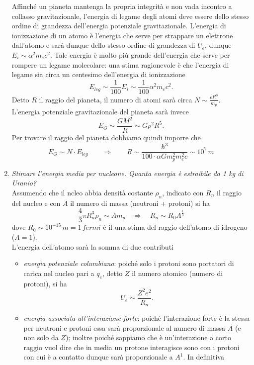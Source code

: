 \begin{enumerate}
	Affinché un pianeta mantenga la propria integrità e non vada incontro a collasso gravitazionale, l'energia di legame degli atomi deve essere dello stesso ordine di grandezza dell'energia potenziale gravitazionale. L'energia di ionizzazione di un atomo è l'energia che serve per strappare un elettrone dall'atomo e sarà dunque dello stesso ordine di grandezza di $ U_e $, dunque $ E_{i} \sim \alpha^2 m_e c^2 $. Tale energia è molto più grande dell'energia che serve per rompere un legame molecolare: una stima ragionevole è che l'energia di legame sia circa un centesimo dell'energia di ionizzazione \[E_{leg} \sim \frac{1}{100} E_{i} \sim \frac{1}{100} \alpha^2 m_e c^2.\] Detto $ R $ il raggio del pianeta, il numero di atomi sarà circa $ N \sim \frac{\rho R^3}{m_p} $. L'energia potenziale gravitazionale del pianeta sarà invece \[E_G \sim \frac{G M^2}{R} \sim G \rho^2 R^5.\] Per trovare il raggio del pianeta dobbiamo quindi imporre che 
	\begin{equation}
	E_G \sim N \cdot E_{leg} \qquad \Rightarrow \qquad R \sim \frac{\hbar^3}{100 \cdot \alpha G m_p^2 m_e^2 c} \sim 10^7 \, \si{m}
	\end{equation}
	\item \emph{Stimare l'energia media per nucleone. Quanta energia è estraibile da 1 \si{kg} di Uranio?} \\
	Assumendo che il ncleo abbia densità costante $ \rho_n $, indicato con $ R_n $ il raggio del nucleo e con $ A $ il numero di massa (neutroni + protoni) si ha 
	\begin{equation}
	\frac{4}{3} \pi R_n^3 \rho_n \sim A m_p \quad \Rightarrow \quad R_n \sim R_0 A^\frac{1}{3}
	\end{equation}
	dove $ R_0 \sim 10^{-15} \, \si{m} = 1 \, \si{fermi} $ è il una stima del raggio dell'atomo di idrogeno ($ A = 1 $). \\
	L'energia dell'atomo sarà la somma di due contributi 
	\begin{itemize}
		\item \emph{energia potenziale columbiana}: poiché solo i protoni sono portatori di carica nel nucleo pari a $ q_e $, detto $ Z $ il numero atomico (numero di protoni), si ha \[U_e \sim \frac{Z^2 e^2}{R_n}.\]
		\item \emph{energia associata all'interazione forte}: poiché l'interazione forte è la stessa per neutroni e protoni essa sarà proporzionale al numero di massa $ A $ (e non solo da $ Z $); inoltre poiché sappiamo che è un'interazione a corto raggio vuol dire che in media un protone interagisce sono con i protoni con cui è a contatto dunque sarà proporzionale a $ A^1 $. In definitiva

\end{itemize}
\end{enumerate}
